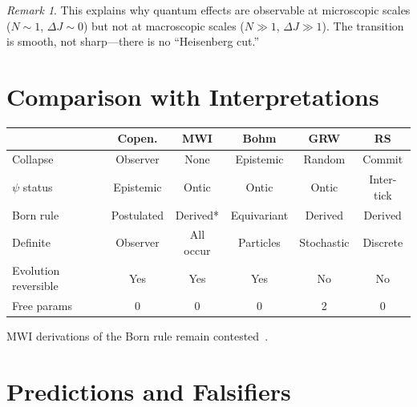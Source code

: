 \documentclass[12pt,a4paper]{article}
\theoremstyle{definition}
\theoremstyle{remark}
\newtheorem{remark}[theorem]{Remark}
\begin{document}
\begin{remark}
This explains why quantum effects are observable at microscopic
scales ($N \sim 1$, $\Delta J \sim 0$) but not at macroscopic
scales ($N \gg 1$, $\Delta J \gg 1$).  The transition is smooth,
not sharp---there is no ``Heisenberg cut.''
\end{remark}

\section{Comparison with Interpretations}
\label{sec:comparison}

\begin{center}
\renewcommand{\arraystretch}{1.3}
\begin{tabular}{@{}lccccc@{}}
\toprule
& \textbf{Copen.} & \textbf{MWI} & \textbf{Bohm} &
\textbf{GRW} & \textbf{RS} \\
\midrule
Collapse & Observer & None & Epistemic &
Random & Commit \\
$\psi$ status & Epistemic & Ontic & Ontic &
Ontic & Inter-tick \\
Born rule & Postulated & Derived* & Equivariant &
Derived & Derived \\
Definite & Observer & All occur & Particles &
Stochastic & Discrete \\
Evolution reversible & Yes & Yes & Yes &
No & No \\
Free params & 0 & 0 & 0 & 2 & 0 \\
\bottomrule
\end{tabular}
\end{center}

\noindent *MWI derivations of the Born rule remain
contested~\cite{Kent,Zurek}.

\section{Predictions and Falsifiers}
\label{sec:falsifiers}
\end{document}
